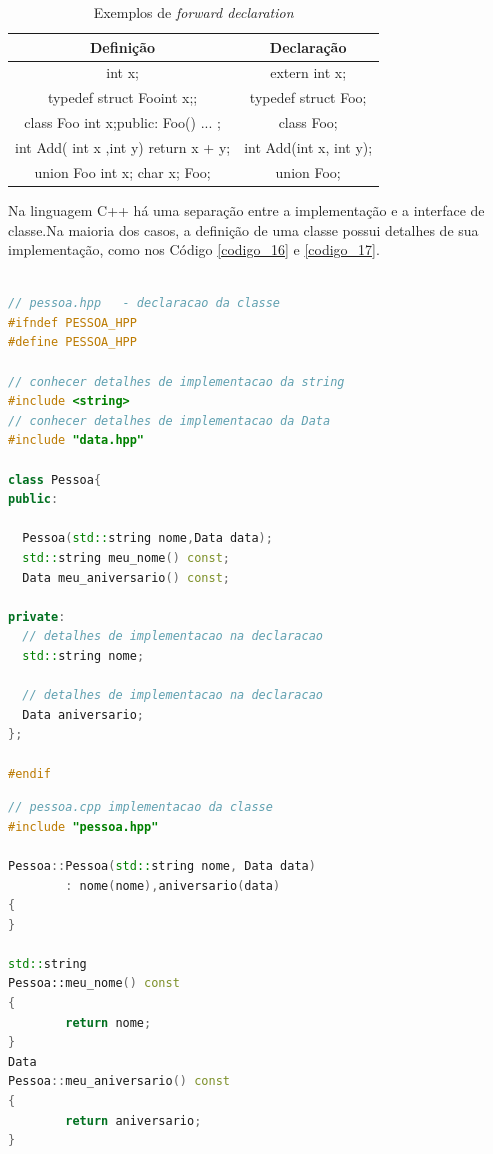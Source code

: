 \begin{table}[h]
    \centering
    \begin{tabular}{ |c | c |}
    \hline
    Definição & Declaração\\
    \hline
    int x; & extern int x;\\
    \hline
    typedef struct Foo{int x;}; & typedef struct Foo;\\
    \hline
    class Foo { int x;public: Foo() ... }; & class Foo;\\
    \hline
    int Add( int x ,int  y) { return x + y; } & int Add(int x, int y);\\
    \hline
    union Foo { int x; char x; }Foo; & union Foo;\\
    \hline
    \end{tabular}
    \caption{Exemplos de \textit{forward declaration}}
    \label{tab:tabela_03}
\end{table}


Na linguagem C++ há uma separação entre  a implementação e a interface de
 classe\cite{ref44}.Na maioria dos casos, a definição de uma classe possui
 detalhes de sua implementação, como nos Código \ref{codigo_16} e \ref{codigo_17}.


\begin{lstlisting}[language=C++,frame=single,captionpos=b,caption={ 
                          Arquivo declaração da classe Pessoa },
                                                label=codigo_16]

// pessoa.hpp   - declaracao da classe
#ifndef PESSOA_HPP
#define PESSOA_HPP

// conhecer detalhes de implementacao da string
#include <string>       
// conhecer detalhes de implementacao da Data
#include "data.hpp"     

class Pessoa{
public:

  Pessoa(std::string nome,Data data);
  std::string meu_nome() const;
  Data meu_aniversario() const;

private:
  // detalhes de implementacao na declaracao
  std::string nome;        

  // detalhes de implementacao na declaracao
  Data aniversario;        
};

#endif

\end{lstlisting}

\begin{lstlisting}[language=C++,frame=single,captionpos=b,caption={
                               Arquivo definição da classe Pessoa},
                                                    label=codigo_17]
// pessoa.cpp implementacao da classe
#include "pessoa.hpp"

Pessoa::Pessoa(std::string nome, Data data)
        : nome(nome),aniversario(data)
{
}

std::string
Pessoa::meu_nome() const
{
        return nome;
}
Data
Pessoa::meu_aniversario() const
{
        return aniversario;
}

\end{lstlisting}    


